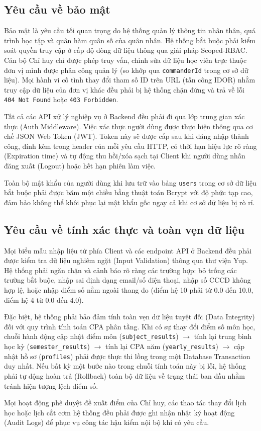 \documentclass[../DoAn.tex]{subfiles}
\begin{document}
\subsection{Yêu cầu về bảo mật}
\label{subsection:2.4.3}
Bảo mật là yêu cầu tối quan trọng do hệ thống quản lý thông tin nhân thân, quá trình học tập và quân hàm quân số của quân nhân. Hệ thống bắt buộc phải kiểm soát quyền truy cập ở cấp độ dòng dữ liệu thông qua giải pháp Scoped-RBAC. Cán bộ Chỉ huy chỉ được phép truy vấn, chỉnh sửa dữ liệu học viên trực thuộc đơn vị mình được phân công quản lý (so khớp qua \texttt{commanderId} trong cơ sở dữ liệu). Mọi hành vi cố tình thay đổi tham số ID trên URL (tấn công IDOR) nhằm truy cập dữ liệu của đơn vị khác đều phải bị hệ thống chặn đứng và trả về lỗi \texttt{404 Not Found} hoặc \texttt{403 Forbidden}.
\par
Tất cả các API xử lý nghiệp vụ ở Backend đều phải đi qua lớp trung gian xác thực (Auth Middleware). Việc xác thực người dùng được thực hiện thông qua cơ chế JSON Web Token (JWT). Token này sẽ được cấp sau khi đăng nhập thành công, đính kèm trong header của mỗi yêu cầu HTTP, có thời hạn hiệu lực rõ ràng (Expiration time) và tự động thu hồi/xóa sạch tại Client khi người dùng nhấn đăng xuất (Logout) hoặc hết hạn phiên làm việc.
\par
Toàn bộ mật khẩu của người dùng khi lưu trữ vào bảng \texttt{users} trong cơ sở dữ liệu bắt buộc phải được băm một chiều bằng thuật toán Bcrypt với độ phức tạp cao, đảm bảo không thể khôi phục lại mật khẩu gốc ngay cả khi cơ sở dữ liệu bị rò rỉ.

\subsection{Yêu cầu về tính xác thực và toàn vẹn dữ liệu}
\label{subsection:2.4.4}
Mọi biểu mẫu nhập liệu từ phía Client và các endpoint API ở Backend đều phải được kiểm tra dữ liệu nghiêm ngặt (Input Validation) thông qua thư viện Yup. Hệ thống phải ngăn chặn và cảnh báo rõ ràng các trường hợp: bỏ trống các trường bắt buộc, nhập sai định dạng email/số điện thoại, nhập số CCCD không hợp lệ, hoặc nhập điểm số nằm ngoài thang đo (điểm hệ 10 phải từ 0.0 đến 10.0, điểm hệ 4 từ 0.0 đến 4.0).
\par
Đặc biệt, hệ thống phải bảo đảm tính toàn vẹn dữ liệu tuyệt đối (Data Integrity) đối với quy trình tính toán CPA phân tầng. Khi có sự thay đổi điểm số môn học, chuỗi hành động cập nhật điểm môn (\texttt{subject\_results}) $\rightarrow$ tính lại trung bình học kỳ (\texttt{semester\_results}) $\rightarrow$ tính lại CPA năm (\texttt{yearly\_results}) $\rightarrow$ cập nhật hồ sơ (\texttt{profiles}) phải được thực thi lồng trong một Database Transaction duy nhất. Nếu bất kỳ một bước nào trong chuỗi tính toán này bị lỗi, hệ thống phải tự động hoàn trả (Rollback) toàn bộ dữ liệu về trạng thái ban đầu nhằm tránh hiện tượng lệch điểm số.
\par
Mọi hoạt động phê duyệt đề xuất điểm của Chỉ huy, các thao tác thay đổi lịch học hoặc lịch cắt cơm hệ thống đều phải được ghi nhận nhật ký hoạt động (Audit Logs) để phục vụ công tác hậu kiểm nội bộ khi có yêu cầu.


\end{document}
